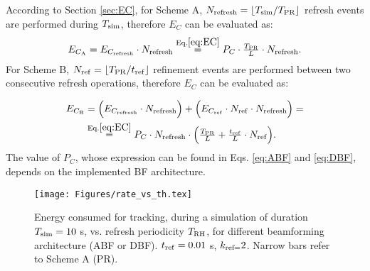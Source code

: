 \documentclass[conference]{IEEEtran}
\newlength\fheight
\newlength\fwidth
\def\beq{\begin{equation}}
\def\eeq{\end{equation}}
\newif\iftikz
\begin{document}
According to Section \ref{sec:EC}, for Scheme A, $N_{\rm refresh}=\lfloor{T_{\rm sim}/T_{\rm PR}}\rfloor$ refresh events are performed during $T_{\rm sim}$, therefore  $E_C$ can be evaluated as:
\beq
E_{C_{\rm A}} = E_{C_{\rm refresh}}\cdot N_{\rm refresh} \overset{\mathrm{Eq. \eqref{eq:EC}}} {=} P_C \cdot\tfrac{ T_{\rm PR}}{L} \cdot N_{\rm refresh}.
\eeq
For Scheme B, $N_{\rm ref}=\lfloor{T_{\rm PR}/t_{\rm ref}}\rfloor$ refinement events are performed between two consecutive refresh operations, therefore  $E_C$ can be evaluated as:

\begin{align}
 E_{C_{\rm B}} &= \Big(E_{C_{\rm refresh}}\cdot N_{\rm refresh}\Big) + \Big(E_{C_{\rm ref}}\cdot N_{\rm ref} \cdot N_{\rm refresh}\Big)\notag = \\
&  \overset{\mathrm{Eq. \eqref{eq:EC}}} {=} P_C\cdot  N_{\rm refresh} \cdot \Big( \tfrac{T_{\rm PR}}{L} + \tfrac{t_{\rm ref}}{L}\cdot N_{\rm ref} \Big).
\end{align}
The value of $P_C$, whose expression can be found in Eqs. \eqref{eq:ABF} and \eqref{eq:DBF}, depends on the implemented BF architecture.


\begin{figure}[t!]
\centering
		\setlength{\belowcaptionskip}{0cm}
		\iftikz
		\setlength{\belowcaptionskip}{0cm}
		\setlength\fwidth{0.78\columnwidth}
		\setlength\fheight{0.43\columnwidth}
		
		\else
		\texttt{[image: Figures/rate\_vs\_th.tex]}
		\fi
		\caption{Energy consumed for tracking, during a simulation of duration $T_{\rm sim}=10$ s, vs. refresh periodicity $T_{\rm RH}$, for different beamforming architecture (ABF or DBF). $t_{\rm ref} = 0.01$ s, $k_{\rm ref=}2$. Narrow bars refer to Scheme A (PR).}
		\vspace{-1.2em}
		\label{fig:EC_vs_ADBF}
	\end{figure}
\end{document}
